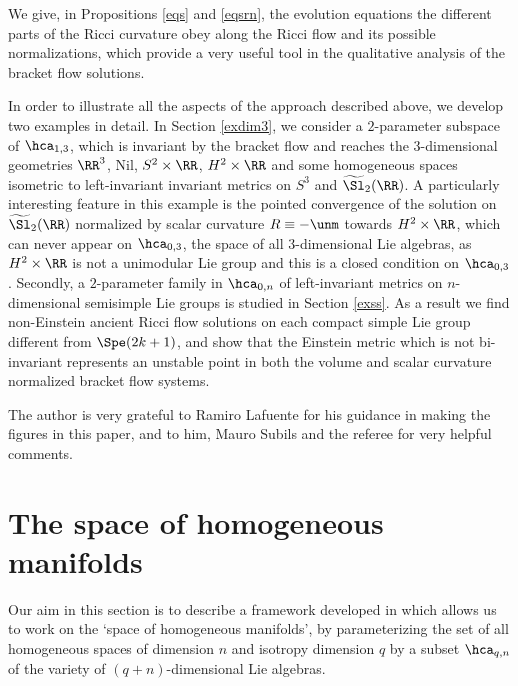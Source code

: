 \documentclass[11pt]{amsart}
\theoremstyle{plain}
\theoremstyle{definition}
\theoremstyle{remark}
\begin{document}
We give, in Propositions \ref{eqs} and \ref{eqsrn}, the evolution equations the different parts of the Ricci curvature obey along the Ricci flow and its possible normalizations, which provide a very useful tool in the qualitative analysis of the bracket flow solutions.

In order to illustrate all the aspects of the approach described above, we develop two examples in detail.  In Section \ref{exdim3}, we consider a $2$-parameter subspace of $\hca_{1,3}$, which is invariant by the bracket flow and reaches the $3$-dimensional geometries $\RR^3$, Nil, $S^2\times\RR$, $H^2\times\RR$ and some homogeneous spaces isometric to left-invariant invariant metrics on $S^3$ and $\widetilde{\Sl}_2(\RR)$.  A particularly interesting feature in this example is the pointed convergence of the solution on $\widetilde{\Sl}_2(\RR)$ normalized by scalar curvature $R\equiv -\unm$ towards $H^2\times\RR$, which can never appear on $\hca_{0,3}$, the space of all $3$-dimensional Lie algebras, as $H^2\times\RR$ is not a unimodular Lie group and this is a closed condition on $\hca_{0,3}$.  Secondly, a $2$-parameter family in $\hca_{0,n}$ of left-invariant metrics on $n$-dimensional semisimple Lie groups is studied in Section \ref{exss}.  As a result we find non-Einstein ancient Ricci flow solutions on each compact simple Lie group different from $\Spe(2k+1)$, and show that the Einstein metric which is not bi-invariant represents an unstable point in both the volume and scalar curvature normalized bracket flow systems.





\vs {} The author is very grateful to Ramiro Lafuente for his guidance in making the figures in this paper, and to him, Mauro Subils and the referee for very helpful comments.












\section{The space of homogeneous manifolds}\label{hm}

Our aim in this section is to describe a framework developed in \cite{spacehm} which allows us to work on the `space of homogeneous manifolds', by parameterizing  the set of all homogeneous spaces of dimension $n$ and isotropy dimension $q$ by a subset $\hca_{q,n}$ of the variety of $(q+n)$-dimensional Lie algebras.
\end{document}
